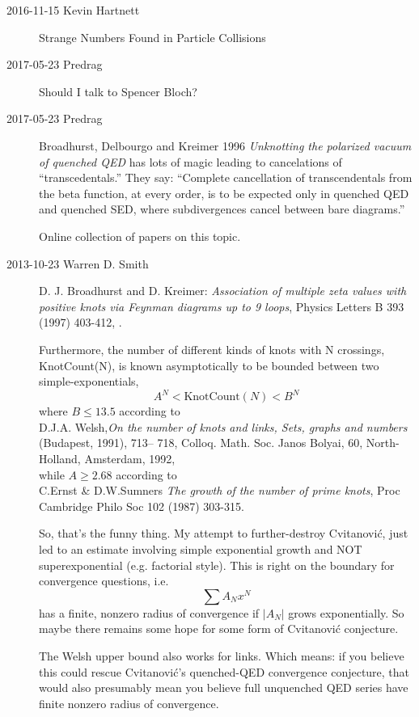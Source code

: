 \begin{description}
\item[2016-11-15 Kevin Hartnett]
{Strange Numbers Found in Particle Collisions}

\item[2017-05-23 Predrag] Should I talk to
 {Spencer Bloch}?

\item[2017-05-23 Predrag]
Broadhurst, Delbourgo and Kreimer 1996
{\em Unknotting the polarized vacuum of quenched {QED}} has
lots of magic leading to cancelations of ``transcedentals.''
They say: ``Complete cancellation of transcendentals from the
beta function, at every order, is to be expected only in
quenched QED and quenched SED, where subdivergences
cancel between bare diagrams.''

 Online collection of papers on
 {this topic}.


\item[2013-10-23  Warren D. Smith]

D. J. Broadhurst and D. Kreimer:
\emph{Association of multiple zeta values with positive knots via Feynman
diagrams up to 9 loops},
Physics Letters B 393 (1997) 403-412,
.

Furthermore, the number of different kinds of knots with N crossings,
KnotCount(N), is known asymptotically to be bounded between two
simple-exponentials,
\[
A^N < \mbox{KnotCount}(N) < B^N
\]
where
$B\leq 13.5$ according to\\
   D.J.A. Welsh,{\em On the number of knots and links, Sets, graphs and
numbers} (Budapest, 1991), 713– 718, Colloq. Math. Soc. Janos Bolyai,
60, North-Holland, Amsterdam, 1992,
\\
while
$A\geq 2.68$ according to\\
C.Ernst \& D.W.Sumners {\em The growth of the number of prime knots},
Proc Cambridge Philo Soc 102 (1987) 303-315.

So, that's the funny thing.
My attempt to further-destroy Cvitanovi\'c, just led to an estimate
involving simple
exponential growth and NOT superexponential (e.g. factorial style).
This is right on the boundary for convergence questions, i.e.
\[
\sum A_N  x^N
\]
has a finite, nonzero radius of convergence if $|A_N|$ grows
exponentially. So maybe there remains some hope for some form of
Cvitanovi\'c conjecture.

The Welsh upper bound also works for links. Which means: if you believe
this could rescue Cvitanovi\'c's quenched-QED convergence conjecture,
that would also presumably mean you believe full unquenched QED series
have finite nonzero radius of convergence.


\end{description}
